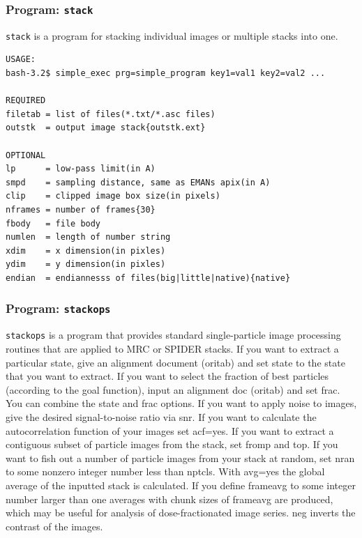 \documentclass[a4paper,11pt]{article}
\newcommand{\prgname}[1]{\textcolor{NavyBlue}{\texttt{#1}}}
\begin{document}
\subsubsection{Program: \prgname{stack}}
\label{stack}
\prgname{stack} is a program for stacking individual images or multiple stacks into one.

\begin{verbatim}
USAGE:
bash-3.2$ simple_exec prg=simple_program key1=val1 key2=val2 ...

REQUIRED
filetab = list of files(*.txt/*.asc files)
outstk  = output image stack{outstk.ext}

OPTIONAL
lp      = low-pass limit(in A)
smpd    = sampling distance, same as EMANs apix(in A)
clip    = clipped image box size(in pixels)
nframes = number of frames{30}
fbody   = file body
numlen  = length of number string
xdim    = x dimension(in pixles)
ydim    = y dimension(in pixles)
endian  = endiannesss of files(big|little|native){native}
\end{verbatim}

\subsubsection{Program: \prgname{stackops}}
\label{stackops}
\prgname{stackops} is a program that provides standard single-particle image processing routines that are applied to MRC or SPIDER stacks. If you want to extract a particular state, give an alignment document (oritab) and set state to the state that you want to extract. If you want to select the fraction of best particles (according to the goal function), input an alignment doc (oritab) and set frac. You can combine the state and frac options. If you want to apply noise to images, give the desired signal-to-noise ratio via snr. If you want to calculate the autocorrelation function of your images set acf=yes. If you want to extract a contiguous subset of particle images from the stack, set fromp and top. If you want to fish out a number of particle images from your stack at random, set nran to some nonzero integer number less than nptcls. With avg=yes the global average of the inputted stack is calculated. If you define frameavg to some integer number larger than one averages with chunk sizes of frameavg are produced, which may be useful for analysis of dose-fractionated image series. neg inverts the contrast of the images.
\end{document}
